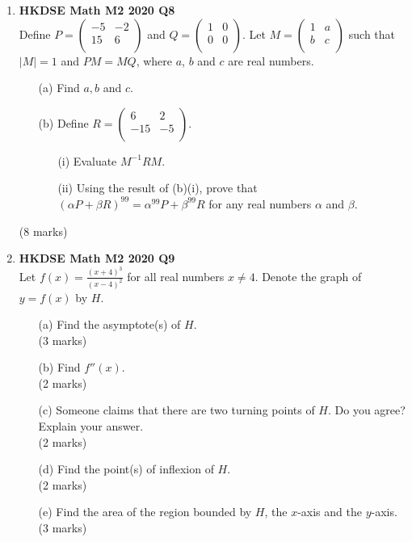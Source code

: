 \documentclass[12pt]{article}
\begin{document}
\begin{enumerate}
	\item \textbf{HKDSE Math M2 2020 Q8}\\
	Define $P = 
				\begin{pmatrix}
				-5&-2\\
				15&6\\
				\end{pmatrix}$ and $Q = 
				\begin{pmatrix}
				1&0\\
				0&0\\
				\end{pmatrix}$. Let $M = 
				\begin{pmatrix}
				1&a\\
				b&c\\
				\end{pmatrix}$  such that $|M| = 1$ and $PM = MQ$, where $a$, $b$ and $c$ are real numbers.
	\begin{enumerate}
		\item [(a)] Find $a,b$ and $c$. 
		\item [(b)] Define $R = 
				\begin{pmatrix}
				6&2\\
				-15&-5\\
				\end{pmatrix}$. 
		\begin{enumerate}
			\item [(i)]Evaluate $M^{-1}RM$. 
			\item [(ii)]Using the result of (b)(i), prove that $(\alpha P + \beta R)^{99} = \alpha^{99}P+\beta ^{99}R$ for any real numbers $\alpha$ and $\beta$. 
		\end{enumerate} 
	\end{enumerate}
	(8 marks)

	\item \textbf{HKDSE Math M2 2020 Q9}\\
	Let $\displaystyle f(x) = \frac{(x+4)^3}{(x-4)^2}$ for all real numbers $x \neq 4$. Denote the graph of $y = f(x)$ by $H$.
	\begin{enumerate}
		\item [(a)] Find the asymptote(s) of $H$. \\(3 marks)
		\item [(b)] Find $f''(x)$. \\(2 marks)
		\item [(c)] Someone claims that there are two turning points of $H$. Do you agree? Explain your answer. \\(2 marks)
		\item [(d)] Find the point(s) of inflexion of $H$. \\(2 marks)
		\item [(e)] Find the area of the region bounded by $H$, the $x$-axis and the $y$-axis. \\ (3 marks)
	\end{enumerate}



\end{enumerate}
\end{document}
